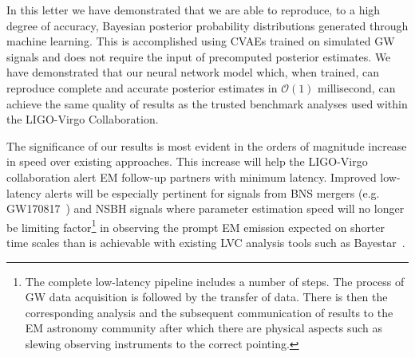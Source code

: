 \documentclass[%
showpacs,
 amsmath,amssymb,
 aps,
 twocolumn,
 prl,
 reprint,
floatfix,
]{revtex4-1}
\begin{document}
%
%
%
In this letter we have demonstrated that we are able to reproduce, to a high
degree of accuracy, Bayesian posterior probability distributions generated
through machine learning. This is accomplished using \acp{CVAE} trained on
simulated \ac{GW} signals and does not require the input of precomputed
posterior estimates. We have demonstrated that our neural network model which,
when trained, can reproduce complete and accurate posterior estimates in
$\mathcal{O}(1)$ millisecond, can achieve the same quality of results as the
trusted benchmark analyses used within the LIGO-Virgo Collaboration.

%
%
The significance of our results is most evident in the orders of magnitude
increase in speed over existing approaches. This increase will help the
LIGO-Virgo collaboration alert \ac{EM} follow-up partners with minimum latency.
Improved low-latency alerts will be especially pertinent for signals from
\ac{BNS} mergers (e.g. GW170817~\cite{PhysRevLett.119.161101}) and \ac{NSBH} signals where
parameter estimation speed will no longer be limiting factor\footnote{The complete
low-latency pipeline includes a number of steps. The process of \ac{GW} data
acquisition is followed by the transfer of data. There is then the corresponding
analysis and the subsequent communication of results to the \ac{EM} astronomy
community after which there are physical aspects such as slewing observing
instruments to the correct pointing.} in observing the prompt \ac{EM} emission
expected on shorter time scales than is achievable with existing \ac{LVC}
analysis tools such as Bayestar~\cite{2016PhRvD..93b4013S}. 
\end{document}
